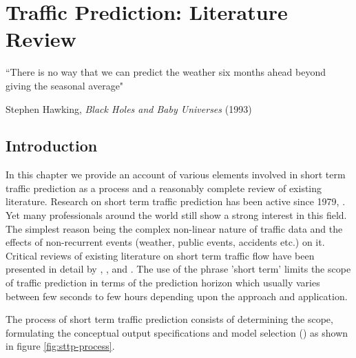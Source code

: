 
\chapter{Traffic Prediction: Literature Review}

\label{Chapter2}


{``There is no way that we can predict the weather six months ahead beyond giving the seasonal
average"}
\begin{flushright}
Stephen Hawking, \textit{Black Holes and Baby Universes} (1993)
\end{flushright}

\section{Introduction}
In this chapter we provide an account of various elements involved in short term traffic prediction
as a process and a reasonably complete review of existing literature. Research on short term traffic
prediction has been active since 1979, \citet{ahmed1979analysis}. Yet many professionals around the
world still show a strong interest in this field.
The simplest reason being the complex non-linear nature of traffic data and the effects of
non-recurrent events (weather, public events, accidents etc.) on it.  Critical reviews of existing
literature on short term traffic flow have been presented in detail by \citet{smith1997traffic},
\citet{vlahogianni2004short}, \citet{van2012short} and \citet{vlahogianni2014short}. The use of
the phrase 'short term' limits the scope of traffic prediction in terms of the prediction horizon
which usually varies between few seconds to few hours depending upon the approach and application.

The process of short term traffic prediction consists of determining the scope, formulating the
conceptual output specifications and model selection (\citet{vlahogianni2004short}) as shown in
figure \ref{fig:sttp-process}.

